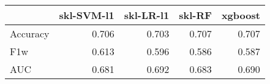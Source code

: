 \begin{tabular}{lrrrr}
\toprule
{} &  skl-SVM-l1 &  skl-LR-l1 &  skl-RF &  xgboost \\
\midrule
Accuracy &       0.706 &      0.703 &   0.707 &    0.707 \\
F1w      &       0.613 &      0.596 &   0.586 &    0.587 \\
AUC      &       0.681 &      0.692 &   0.683 &    0.690 \\
\bottomrule
\end{tabular}
